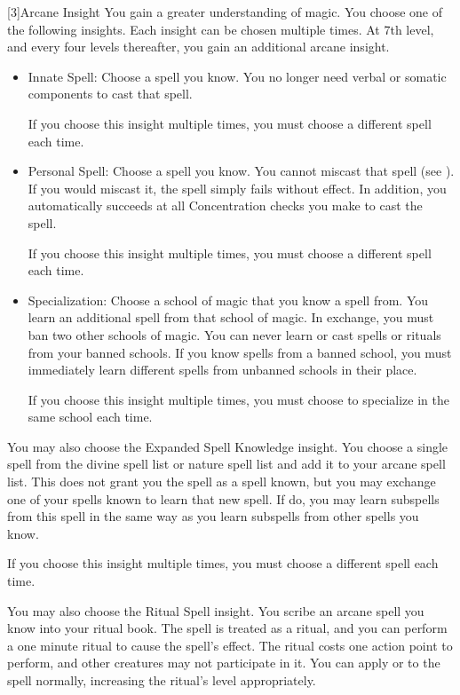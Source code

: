         [3]{Arcane Insight} 
        You gain a greater understanding of magic.
        You choose one of the following insights.
        Each insight can be chosen multiple times.
        At 7th level, and every four levels thereafter, you gain an additional arcane insight.
        \begin{itemize}
            \item Innate Spell: Choose a spell you know.
                You no longer need verbal or somatic components to cast that spell.
                \par If you choose this insight multiple times, you must choose a different spell each time.
            \item Personal Spell: Choose a spell you know.
                You cannot miscast that spell (see ).
                If you would miscast it, the spell simply fails without effect.
                In addition, you automatically succeeds at all Concentration checks you make to cast the spell.
                \par If you choose this insight multiple times, you must choose a different spell each time.
            \item Specialization: Choose a school of magic that you know a spell from.
                You learn an additional spell from that school of magic.
                In exchange, you must ban two other schools of magic.
                You can never learn or cast spells or rituals from your banned schools.
                If you know spells from a banned school, you must immediately learn different spells from unbanned schools in their place.
                \par If you choose this insight multiple times, you must choose to specialize in the same school each time.
        \end{itemize}

         You may also choose the Expanded Spell Knowledge insight.
        You choose a single spell from the divine spell list or nature spell list and add it to your arcane spell list.
        This does not grant you the spell as a spell known, but you may exchange one of your spells known to learn that new spell.
        If do, you may learn subspells from this spell in the same way as you learn subspells from other spells you know.
        \par If you choose this insight multiple times, you must choose a different spell each time.

         You may also choose the Ritual Spell insight.
        You scribe an arcane spell you know into your ritual book.
        The spell is treated as a ritual, and you can perform a one minute ritual to cause the spell's effect.
        The ritual costs one action point to perform, and other creatures may not participate in it.
        You can apply  or  to the spell normally, increasing the ritual's level appropriately.

